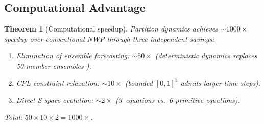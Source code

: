 \documentclass[10pt,twocolumn]{article}
\newtheorem{theorem}{Theorem}[section]
\theoremstyle{definition}
\theoremstyle{remark}
\begin{document}
\subsection{Computational Advantage}\label{sec:speedup}

\begin{theorem}[Computational speedup]\label{thm:speedup}
Partition dynamics achieves ${\sim}1000\times$ speedup over
conventional NWP through three independent savings:
\begin{enumerate}[label=(\roman*),leftmargin=*,itemsep=1pt]
\item Elimination of ensemble forecasting:
  ${\sim}50\times$ (deterministic dynamics replaces
  50-member ensembles \citep{Buizza1999}).
\item CFL constraint relaxation: ${\sim}10\times$
  (bounded $[0,1]^3$ admits larger time steps).
\item Direct S-space evolution: ${\sim}2\times$
  (3~equations vs.\ 6 primitive equations).
\end{enumerate}
Total: $50\times 10\times 2 = 1000\times$.
\end{theorem}
\end{document}

